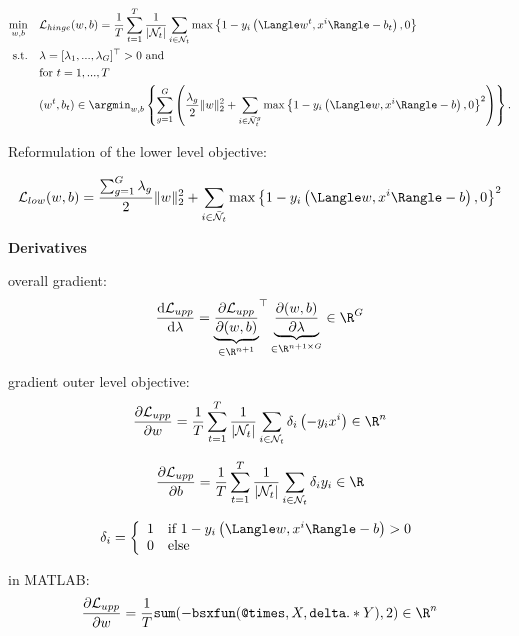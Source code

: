 \begin{align}
\begin{split}
	\min_{w,b} \quad &  \mathcal{L}_{hinge}(w,b) = \frac{1}{T}\sum_{t=1}^T\frac{1}{|\mathcal{N}_t|}\sum_{i \in \mathcal{N}_t}{\max\left\{1-y_i\left(\Langle w^t,x^i\Rangle-b_t\right),0\right\}}\\
	\text{s.t.} \quad & \lambda = [\lambda_1,...,\lambda_G]^{\top} > 0 \text{ and} \\
	& \text{for } t = 1,...,T \\
	& (w^t,b_t) \in \argmin_{w,b}\left\{ \sum_{g = 1}^G \left(\frac{\lambda_g}{2} \|w\|^2_2+\sum_{i\in \bar{\mathcal{N}}_t^g}\max\left\{1-y_i\left(\Langle w,x^i\Rangle-b\right),0\right\}^2\right)\right\}. \\
\end{split}
\label{multi_group}
\end{align}


Reformulation of the lower level objective:

\begin{equation*}
	\mathcal{L}_{low}(w,b) =  \frac{\sum_{g = 1}^G\lambda_g}{2} \|w\|^2_2+\sum_{i\in \bar{\mathcal{N}}_t}\max\left\{1-y_i\left(\Langle w,x^i\Rangle-b\right),0\right\}^2
\label{ll_mult_group}
\end{equation*}



\textbf{Derivatives}

overall gradient:
	\[ \frac{\textup{d}\mathcal{L}_{upp}}{\textup{d}\lambda} = {\underbrace{\frac{\partial \mathcal{L}_{upp}}{\partial (w,b)}}_{\in \R^{n+1}}} ^{\top} \underbrace{\frac{\partial (w,b)}{\partial \lambda}}_{\in \R^{n+1 \times G}} \in \R^G\]


gradient outer level objective: 
	\[ \frac{\partial \mathcal{L}_{upp}}{\partial w} = \frac{1}{T}\sum_{t=1}^T\frac{1}{|\mathcal{N}_t|}\sum_{i \in \mathcal{N}_t} \delta_i \left( -y_i x^i\right) \in \R^n\]
	
	\[ \frac{\partial \mathcal{L}_{upp}}{\partial b} = \frac{1}{T}\sum_{t=1}^T\frac{1}{|\mathcal{N}_t|}\sum_{i \in \mathcal{N}_t} \delta_i y_i \in \R\]
	
	\[ \delta_i = \left\{ \begin{array}{cl} 1 & \text{if } 1-y_i\left(\Langle w,x^i\Rangle-b\right) > 0 \\
		0 & \text{else}\end{array} \right.\]


in MATLAB: 
	\[ \frac{\partial \mathcal{L}_{upp}}{\partial w} = \frac{1}{T}\texttt{sum}(-\texttt{bsxfun}(\texttt{@times},X,\texttt{delta}.*Y) ,2) \in \R^n\]
	
